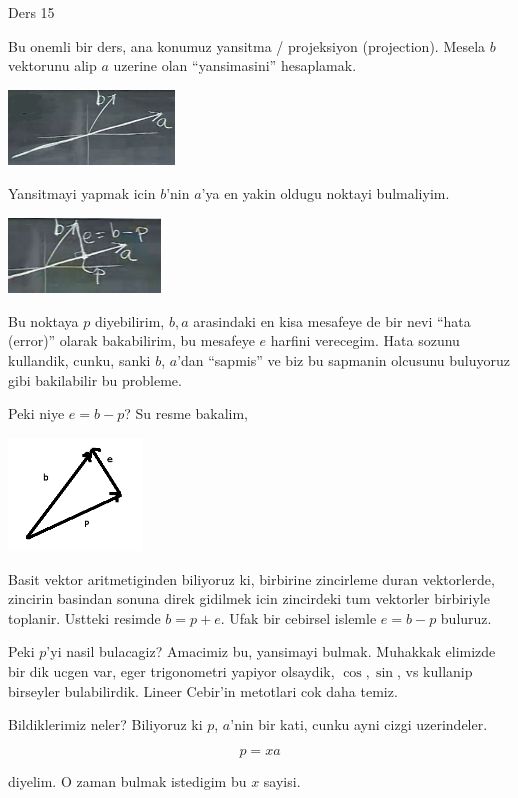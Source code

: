 \documentclass[12pt,fleqn]{article}\usepackage{../common}
\begin{document}
Ders 15

Bu onemli bir ders, ana konumuz yansitma / projeksiyon (projection). Mesela
$b$ vektorunu alip $a$ uzerine olan ``yansimasini'' hesaplamak. 

\includegraphics[height=2cm]{15_1.png}

Yansitmayi yapmak icin $b$'nin $a$'ya en yakin oldugu noktayi bulmaliyim. 

\includegraphics[height=2cm]{15_2.png}

Bu noktaya $p$ diyebilirim, $b,a$ arasindaki en kisa mesafeye de bir nevi
``hata (error)''  olarak bakabilirim, bu mesafeye $e$ harfini
verecegim. Hata sozunu kullandik, cunku, sanki $b$, $a$'dan ``sapmis'' ve
biz bu sapmanin olcusunu buluyoruz gibi bakilabilir bu probleme. 

Peki niye $e = b-p$? Su resme bakalim, 

\includegraphics[height=3cm]{15_3.png}

Basit vektor aritmetiginden biliyoruz ki, birbirine zincirleme duran
vektorlerde, zincirin basindan sonuna direk gidilmek icin zincirdeki tum
vektorler birbiriyle toplanir. Ustteki resimde $b = p + e$. Ufak bir
cebirsel islemle $e = b - p$ buluruz. 

Peki $p$'yi nasil bulacagiz? Amacimiz bu, yansimayi bulmak. Muhakkak
elimizde bir dik ucgen var, eger trigonometri yapiyor olsaydik, $\cos,
\sin$, vs kullanip birseyler bulabilirdik. Lineer Cebir'in metotlari cok
daha temiz.

Bildiklerimiz neler? Biliyoruz ki $p$, $a$'nin bir kati, cunku ayni cizgi
uzerindeler. 

\[ p = xa \]

diyelim. O zaman bulmak istedigim bu $x$ sayisi. 
\end{document}
